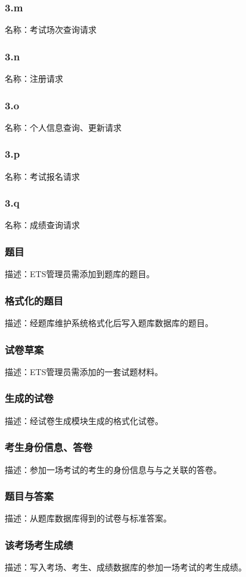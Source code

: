 \subsubsection{3.m}
名称：考试场次查询请求
\subsubsection{3.n}
名称：注册请求
\subsubsection{3.o}
名称：个人信息查询、更新请求
\subsubsection{3.p}
名称：考试报名请求
\subsubsection{3.q}
名称：成绩查询请求
\subsubsection{题目}
描述：ETS管理员需添加到题库的题目。
\subsubsection{格式化的题目}
描述：经题库维护系统格式化后写入题库数据库的题目。
\subsubsection{试卷草案}
描述：ETS管理员需添加的一套试题材料。
\subsubsection{生成的试卷}
描述：经试卷生成模块生成的格式化试卷。
\subsubsection{考生身份信息、答卷}
描述：参加一场考试的考生的身份信息与与之关联的答卷。
\subsubsection{题目与答案}
描述：从题库数据库得到的试卷与标准答案。
\subsubsection{该考场考生成绩}
描述：写入考场、考生、成绩数据库的参加一场考试的考生成绩。


